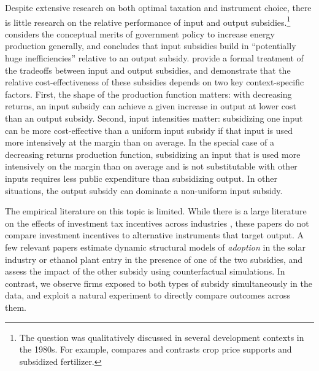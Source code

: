 \documentclass[12pt]{article}
\begin{document}
Despite extensive research on both optimal taxation and instrument choice, there is little research on the relative performance of input and output subsidies.\footnote{The question was qualitatively discussed in several development contexts in the 1980s. For example, \cite{stiglizWB1987} compares and contrasts crop price supports and subsidized fertilizer.} \citet{schmalensee_appropriate_1980} considers the conceptual merits of government policy to increase energy production generally, and concludes that input subsidies build in ``potentially huge inefficiencies'' relative to an output subsidy. \citet{parish_relative_1982} provide a formal treatment of the tradeoffs between input and output subsidies, and demonstrate that the relative cost-effectiveness of these subsidies depends on two key context-specific factors. First, the shape of the production function matters: with decreasing returns, an input subsidy can achieve a given increase in output at lower cost than an output subsidy. Second, input intensities matter: subsidizing one input can be more cost-effective than a uniform input subsidy if that input is used more intensively at the margin than on average. In the special case of a decreasing returns production function, subsidizing an input that is used more intensively on the margin than on average and is not substitutable with other inputs requires less public expenditure than subsidizing output. In other situations, the output subsidy can dominate a non-uniform input subsidy.

The empirical literature on this topic is limited. While there is a large literature on the effects of investment tax incentives across industries \citep[e.g.,][]{goolsbee_investment_1998,goolsbee_taxes_2004,house_temporary_2008}, these papers do not compare investment incentives to alternative instruments that target output. A few relevant papers estimate dynamic structural models of \textit{adoption} in the solar industry \citep{burr2016subsidies,de_groote_subsidies_2019} or ethanol plant entry \citep{yi2018dynamic} in the presence of one of the two subsidies, and assess the impact of the other subsidy using counterfactual simulations. In contrast, we observe firms exposed to both types of subsidy simultaneously in the data, and exploit a natural experiment to directly compare outcomes across them. 
\end{document}
